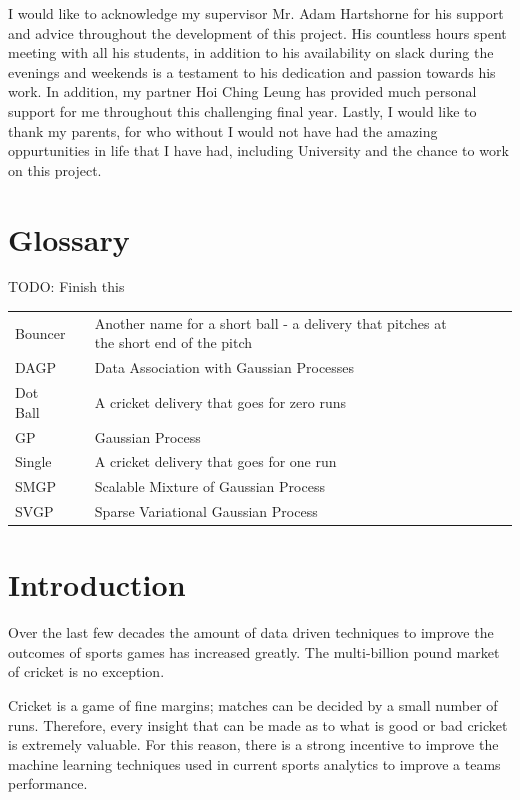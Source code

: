 \documentclass[12pt,a4paper]{report}
\theoremstyle{definition}
\begin{document}
I would like to acknowledge my supervisor Mr. Adam Hartshorne for his support and advice throughout the development of this project.  
His countless hours spent meeting with all his students, in addition to his availability on slack during the evenings and weekends is a testament to his dedication and passion towards his work.
In addition, my partner Hoi Ching Leung has provided much personal support for me throughout this challenging final year.
Lastly, I would like to thank my parents, for who without I would not have had the amazing oppurtunities in life that I have had, including University and the chance to work on this project.

\newpage

\chapter*{Glossary}

TODO: Finish this

\begin{tabular}{l@{}cll@{}cl}
	Bouncer && Another name for a short ball - a delivery that pitches at the short end of the pitch \\
	DAGP && Data Association with Gaussian Processes \\
	Dot Ball && A cricket delivery that goes for zero runs \\
	GP && Gaussian Process \\
	Single && A cricket delivery that goes for one run \\
	SMGP && Scalable Mixture of Gaussian Process \\
	SVGP && Sparse Variational Gaussian Process \\
\end{tabular}

\newpage
\setcounter{page}{1}

\chapter{Introduction}

Over the last few decades the amount of data driven techniques to improve the outcomes of sports games has increased greatly. 
The multi-billion pound market of cricket is no exception. 

Cricket is a game of fine margins; matches can be decided by a small number of runs.
Therefore, every insight that can be made as to what is good or bad cricket is extremely valuable.
For this reason, there is a strong incentive to improve the machine learning techniques used in current sports analytics to improve a teams performance.
\end{document}
